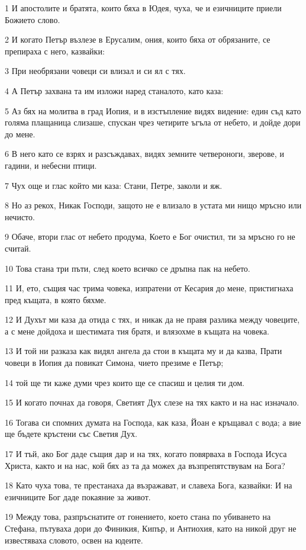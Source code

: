 \par 1 И апостолите и братята, които бяха в Юдея, чуха, че и езичниците приели Божието слово.
\par 2 И когато Петър възлезе в Ерусалим, ония, които бяха от обрязаните, се препираха с него, казвайки:
\par 3 При необрязани човеци си влизал и си ял с тях.
\par 4 А Петър захвана та им изложи наред станалото, като каза:
\par 5 Аз бях на молитва в град Иопия, и в изстъпление видях видение: един съд като голяма плащаница слизаше, спускан чрез четирите ъгъла от небето, и дойде дори до мене.
\par 6 В него като се взрях и разсъждавах, видях земните четвероноги, зверове, и гадини, и небесни птици.
\par 7 Чух още и глас който ми каза: Стани, Петре, заколи и яж.
\par 8 Но аз рекох, Никак Господи, защото не е влизало в устата ми нищо мръсно или нечисто.
\par 9 Обаче, втори глас от небето продума, Което е Бог очистил, ти за мръсно го не считай.
\par 10 Това стана три пъти, след което всичко се дръпна пак на небето.
\par 11 И, ето, същия час трима човека, изпратени от Кесария до мене, пристигнаха пред къщата, в която бяхме.
\par 12 И Духът ми каза да отида с тях, и никак да не правя разлика между човеците, а с мене дойдоха и шестимата тия братя, и влязохме в къщата на човека.
\par 13 И той ни разказа как видял ангела да стои в къщата му и да казва, Прати човеци в Иопия да повикат Симона, чието презиме е Петър;
\par 14 той ще ти каже думи чрез които ще се спасиш и целия ти дом.
\par 15 И когато почнах да говоря, Светият Дух слезе на тях както и на нас изначало.
\par 16 Тогава си спомних думата на Господа, как каза, Йоан е кръщавал с вода; а вие ще бъдете кръстени със Светия Дух.
\par 17 И тъй, ако Бог даде същия дар и на тях, когато повярваха в Господа Исуса Христа, както и на нас, кой бях аз та да можех да възпрепятствувам на Бога?
\par 18 Като чуха това, те престанаха да възражават, и славеха Бога, казвайки: И на езичниците Бог даде покаяние за живот.
\par 19 Между това, разпръснатите от гонението, което стана по убиването на Стефана, пътуваха дори до Финикия, Кипър, и Антиохия, като на никой друг не известяваха словото, освен на юдеите.

